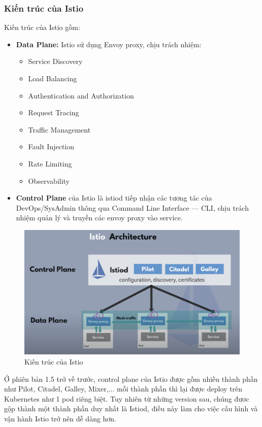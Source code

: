 \documentclass[14pt,a4paper]{book}
\begin{document}
			\subsubsection{Kiến trúc của Istio}
		\hspace{0.6cm}Kiến trúc của Istio gồm:
		\begin{itemize}
			\item \textbf{Data Plane:} Istio sử dụng Envoy proxy, chịu trách nhiệm:
			\begin{itemize}
				\item Service Discovery
				\item Load Balancing
				\item Authentication and Authorization
				\item Request Tracing
				\item Traffic Management
				\item Fault Injection
				\item Rate Limiting
				\item Observability
			\end{itemize}
			\item \textbf{Control Plane} của Istio là istiod tiếp nhận các tương tác của DevOps/SysAdmin thông qua Command Line Interface — CLI, chịu trách nhiệm quản lý và truyền các envoy proxy vào service.
		\end{itemize}
		\begin{figure}[h]
			\centering
			\includegraphics[width=0.7\linewidth]{Pics/2.1.2-p1}
			\caption{Kiến trúc của Istio}
			\label{fig:2.1.2-1}
		\end{figure}
		
		Ở phiên bản 1.5 trở về trước, control plane của Istio được gồm nhiều thành phần như Pilot, Citadel, Galley, Mixer,... mỗi thành phần thì lại được deploy trên Kubernetes như 1 pod riêng biệt. Tuy nhiên từ những version sau, chúng đươc gộp thành một thành phần duy nhất là Istiod, điều này làm cho việc cấu hình và vận hành Istio trở nên dễ dàng hơn.
		
\end{document}
